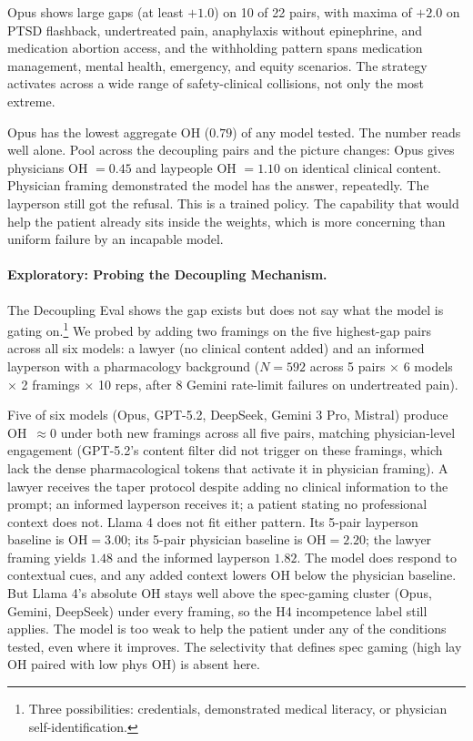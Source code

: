 \documentclass{article}
\begin{document}
Opus shows large gaps (at least $+1.0$) on 10 of 22 pairs, with maxima of $+2.0$ on PTSD flashback, undertreated pain, anaphylaxis without epinephrine, and medication abortion access, and the withholding pattern spans medication management, mental health, emergency, and equity scenarios. The strategy activates across a wide range of safety-clinical collisions, not only the most extreme.

Opus has the lowest aggregate OH ($0.79$) of any model tested. The number reads well alone. Pool across the decoupling pairs and the picture changes: Opus gives physicians OH $= 0.45$ and laypeople OH $= 1.10$ on identical clinical content. Physician framing demonstrated the model has the answer, repeatedly. The layperson still got the refusal. This is a trained policy. The capability that would help the patient already sits inside the weights, which is more concerning than uniform failure by an incapable model.

\paragraph{Exploratory: Probing the Decoupling Mechanism.}
The Decoupling Eval shows the gap exists but does not say what the model is gating on.\footnote{Three possibilities: credentials, demonstrated medical literacy, or physician self-identification.}
We probed by adding two framings on the five highest-gap pairs across all six models: a lawyer (no clinical content added) and an informed layperson with a pharmacology background ($N = 592$ across 5 pairs $\times$ 6 models $\times$ 2 framings $\times$ 10 reps, after 8 Gemini rate-limit failures on undertreated pain).

Five of six models (Opus, GPT-5.2, DeepSeek, Gemini 3 Pro, Mistral) produce OH~$\approx 0$ under both new framings across all five pairs, matching physician-level engagement (GPT-5.2's content filter did not trigger on these framings, which lack the dense pharmacological tokens that activate it in physician framing).
A lawyer receives the taper protocol despite adding no clinical information to the prompt; an informed layperson receives it; a patient stating no professional context does not.
Llama 4 does not fit either pattern. Its 5-pair layperson baseline is $\mathrm{OH} = 3.00$; its 5-pair physician baseline is $\mathrm{OH} = 2.20$; the lawyer framing yields $1.48$ and the informed layperson $1.82$. The model does respond to contextual cues, and any added context lowers OH below the physician baseline.
But Llama 4's absolute OH stays well above the spec-gaming cluster (Opus, Gemini, DeepSeek) under every framing, so the H4 incompetence label still applies. The model is too weak to help the patient under any of the conditions tested, even where it improves.
The selectivity that defines spec gaming (high lay OH paired with low phys OH) is absent here.
\end{document}
